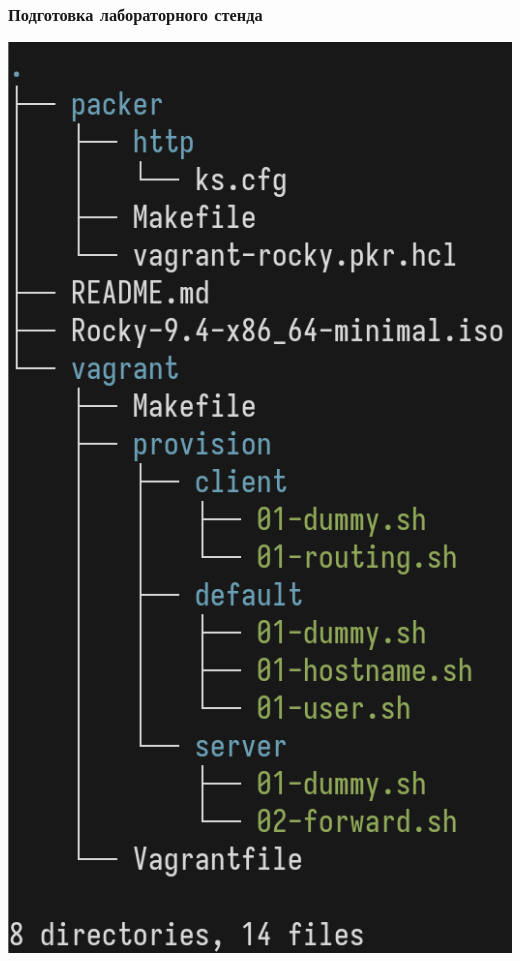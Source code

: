 \begin{frame}
\frametitle{Подготовка лабораторного стенда}
        \centering
    \includegraphics[height=0.8\textheight]{../images/img1.png}
\end{frame}

